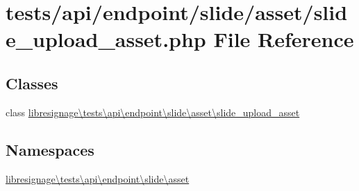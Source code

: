 \hypertarget{tests_2api_2endpoint_2slide_2asset_2slide__upload__asset_8php}{}\section{tests/api/endpoint/slide/asset/slide\+\_\+upload\+\_\+asset.php File Reference}
\label{tests_2api_2endpoint_2slide_2asset_2slide__upload__asset_8php}
\subsection*{Classes}
\begin{DoxyCompactItemize}
\item 
class \hyperlink{classlibresignage_1_1tests_1_1api_1_1endpoint_1_1slide_1_1asset_1_1slide__upload__asset}{libresignage\textbackslash{}tests\textbackslash{}api\textbackslash{}endpoint\textbackslash{}slide\textbackslash{}asset\textbackslash{}slide\+\_\+upload\+\_\+asset}
\end{DoxyCompactItemize}
\subsection*{Namespaces}
\begin{DoxyCompactItemize}
\item 
 \hyperlink{namespacelibresignage_1_1tests_1_1api_1_1endpoint_1_1slide_1_1asset}{libresignage\textbackslash{}tests\textbackslash{}api\textbackslash{}endpoint\textbackslash{}slide\textbackslash{}asset}
\end{DoxyCompactItemize}
